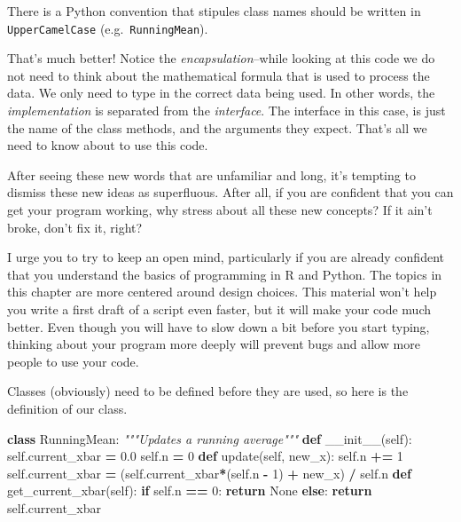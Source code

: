 \documentclass[
  12pt,
  krantz2]{krantz}
\makeatletter
\newenvironment{Shaded}{\begin{snugshade}}{\end{snugshade}}
\newcommand{\CommentTok}[1]{\textcolor[rgb]{0.37,0.37,0.37}{\textit{#1}}}
\newcommand{\ControlFlowTok}[1]{\textcolor[rgb]{0.27,0.27,0.27}{\textbf{#1}}}
\newcommand{\DecValTok}[1]{\textcolor[rgb]{0.06,0.06,0.06}{#1}}
\newcommand{\FloatTok}[1]{\textcolor[rgb]{0.06,0.06,0.06}{#1}}
\newcommand{\FunctionTok}[1]{\textcolor[rgb]{0,0,0}{#1}}
\newcommand{\KeywordTok}[1]{\textcolor[rgb]{0.27,0.27,0.27}{\textbf{#1}}}
\newcommand{\NormalTok}[1]{#1}
\newcommand{\OperatorTok}[1]{\textcolor[rgb]{0.43,0.43,0.43}{\textbf{#1}}}
\newcommand{\VariableTok}[1]{\textcolor[rgb]{0,0,0}{#1}}
\newenvironment{kframe}{%
\medskip{}
\setlength{\fboxsep}{.8em}
 \def\at@end@of@kframe{}%
 \ifinner\ifhmode%
  \def\at@end@of@kframe{\end{minipage}}%
  \begin{minipage}{\columnwidth}%
 \fi\fi%
 \def\FrameCommand##1{\hskip\@totalleftmargin \hskip-\fboxsep
 \colorbox{shadecolor}{##1}\hskip-\fboxsep
     \hskip-\linewidth \hskip-\@totalleftmargin \hskip\columnwidth}%
 \MakeFramed {\advance\hsize-\width
   \@totalleftmargin\z@ \linewidth\hsize
   \@setminipage}}%
 {\par\unskip\endMakeFramed%
 \at@end@of@kframe}
\renewenvironment{Shaded}{\begin{kframe}}{\end{kframe}}
\newenvironment{rmd-details}{\begin{lrbox}{\rmdbox}
  \minipage[c]{\dimexpr \textwidth-2\fboxrule-\wd\bulb-\columnsep}
    \vspace*{\columnsep}}%
{\vspace*{\columnsep}\endminipage\end{lrbox}%
  {\par\color{green}\fboxsep=0pt
    \fbox{\usebox\bulb\usebox\rmdbox\hspace{\columnsep}}\par}}
\newenvironment{rmd-caution}{\begin{lrbox}{\rmdbox}
  \minipage[c]{\dimexpr \textwidth-2\fboxrule-\wd\excl-\columnsep}
    \vspace*{\columnsep}}%
{\vspace*{\columnsep}\endminipage\end{lrbox}%
  {\par\color{yellow}\fboxsep=0pt
    \fbox{\usebox\excl\usebox\rmdbox\hspace{\columnsep}}\par}}
\makeatother
\begin{document}
\begin{rmd-details}
There is a Python convention that stipules class names should be written in \texttt{UpperCamelCase} (e.g.~\texttt{RunningMean}).

\end{rmd-details}

That's much better! Notice the \emph{encapsulation}--while looking at this code we do not need to think about the mathematical formula that is used to process the data. We only need to type in the correct data being used. In other words, the \emph{implementation} is separated from the \emph{interface}. The interface in this case, is just the name of the class methods, and the arguments they expect. That's all we need to know about to use this code.

\begin{rmd-caution}
After seeing these new words that are unfamiliar and long, it's tempting to dismiss these new ideas as superfluous. After all, if you are confident that you can get your program working, why stress about all these new concepts? If it ain't broke, don't fix it, right?

I urge you to try to keep an open mind, particularly if you are already confident that you understand the basics of programming in R and Python. The topics in this chapter are more centered around design choices. This material won't help you write a first draft of a script even faster, but it will make your code much better. Even though you will have to slow down a bit before you start typing, thinking about your program more deeply will prevent bugs and allow more people to use your code.

\end{rmd-caution}

Classes (obviously) need to be defined before they are used, so here is the definition of our class.

\begin{Shaded}
\begin{Highlighting}[]
\KeywordTok{class}\NormalTok{ RunningMean:}
  \CommentTok{"""Updates a running average"""}
  \KeywordTok{def} \FunctionTok{\_\_init\_\_}\NormalTok{(}\VariableTok{self}\NormalTok{):}
    \VariableTok{self}\NormalTok{.current\_xbar }\OperatorTok{=} \FloatTok{0.0}
    \VariableTok{self}\NormalTok{.n }\OperatorTok{=} \DecValTok{0}
  \KeywordTok{def}\NormalTok{ update(}\VariableTok{self}\NormalTok{, new\_x):}
    \VariableTok{self}\NormalTok{.n }\OperatorTok{+=} \DecValTok{1}
    \VariableTok{self}\NormalTok{.current\_xbar }\OperatorTok{=}\NormalTok{ (}\VariableTok{self}\NormalTok{.current\_xbar}\OperatorTok{*}\NormalTok{(}\VariableTok{self}\NormalTok{.n }\OperatorTok{{-}} \DecValTok{1}\NormalTok{) }\OperatorTok{+}\NormalTok{ new\_x) }\OperatorTok{/} \VariableTok{self}\NormalTok{.n}
  \KeywordTok{def}\NormalTok{ get\_current\_xbar(}\VariableTok{self}\NormalTok{):}
    \ControlFlowTok{if} \VariableTok{self}\NormalTok{.n }\OperatorTok{==} \DecValTok{0}\NormalTok{:}
      \ControlFlowTok{return} \VariableTok{None}
    \ControlFlowTok{else}\NormalTok{:}
      \ControlFlowTok{return} \VariableTok{self}\NormalTok{.current\_xbar}
\end{Highlighting}
\end{Shaded}
\end{document}
